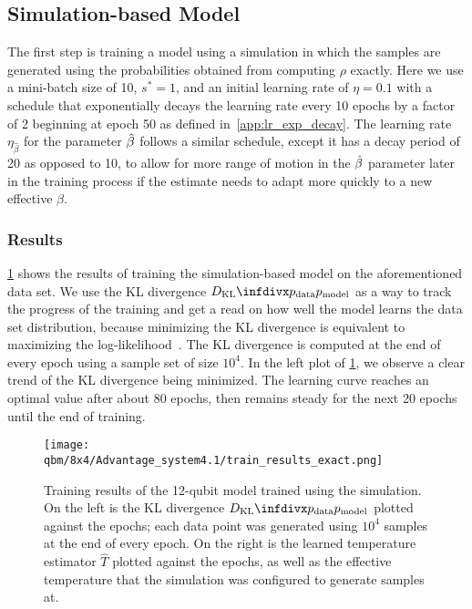 \subsection{Simulation-based Model}
The first step is training a model using a simulation in which the samples are generated using the probabilities obtained from computing \( \rho \) exactly.
Here we use a mini-batch size of 10, \( s^* = 1 \), and an initial learning rate of \( \eta = 0.1 \) with a schedule that exponentially decays the learning rate every 10 epochs by a factor of 2 beginning at epoch 50 as defined in~\cref{app:lr_exp_decay}.
The learning rate \( \eta_{\hat{\beta}} \) for the parameter \( \hat{\beta} \) follows a similar schedule, except it has a decay period of 20 as opposed to 10, to allow for more range of motion in the \( \hat{\beta} \) parameter later in the training process if the estimate needs to adapt more quickly to a new effective \( \beta \).

\subsubsection{Results}\label{sec:qbm_simulation_results}
\cref{fig:train_results_exact} shows the results of training the simulation-based model on the aforementioned data set.
We use the KL divergence \( \DKL{\pdata}{\pmodel} \) as a way to track the progress of the training and get a read on how well the model learns the data set distribution, because minimizing the KL divergence is equivalent to maximizing the log-likelihood~\cite{murphy_2012}.
The KL divergence is computed at the end of every epoch using a sample set of size \( 10^4 \).
In the left plot of \cref{fig:train_results_exact}, we observe a clear trend of the KL divergence being minimized.
The learning curve reaches an optimal value after about 80 epochs, then remains steady for the next 20 epochs until the end of training.

\begin{figure}[!htb]
    \begin{center}
        \texttt{[image: qbm/8x4/Advantage\_system4.1/train\_results\_exact.png]}
    \end{center}
    \caption{
        Training results of the 12-qubit model trained using the simulation.
        On the left is the KL divergence \( \DKL{\pdata}{\pmodel} \) plotted against the epochs; each data point was generated using \( 10^4 \) samples at the end of every epoch.
        On the right is the learned temperature estimator \( \hat{T} \) plotted against the epochs, as well as the effective temperature that the simulation was configured to generate samples at.
    }
    \label{fig:train_results_exact}
\end{figure}

